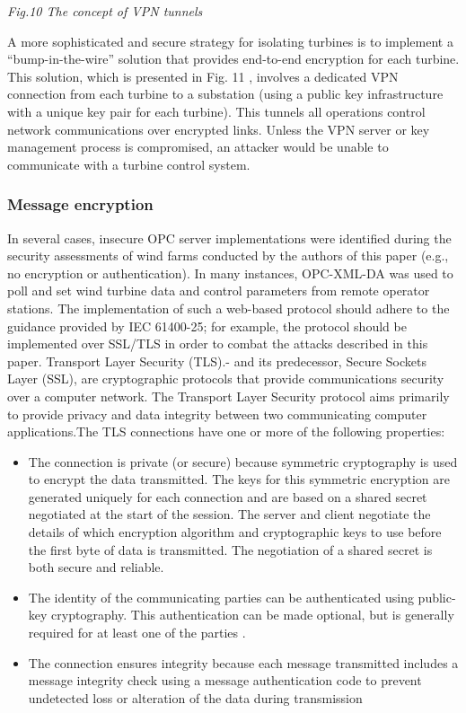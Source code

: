 \documentclass[twosided,a4,10pt]{article}
\begin{document}
\begin{multicols}{2}
\begin{center}
	\textit{Fig.10 The concept of VPN tunnels}
\end{center}
A more sophisticated and secure strategy for isolating turbines is to implement a “bump-in-the-wire” solution that provides end-to-end encryption for each turbine. This solution, which is presented in Fig. 11 , involves a dedicated VPN connection from each turbine to a substation (using a public key infrastructure with a unique key pair 
for each turbine). This tunnels all operations control network communications over encrypted links. Unless the VPN server or key management process is compromised, an attacker would be unable to communicate with a turbine control system. 


\subsubsection{Message encryption}
In several cases, insecure OPC server implementations were identified during the security assessments of wind farms conducted by the authors of this paper (e.g., no encryption or authentication). In many instances, OPC-XML-DA was used to poll and set wind turbine data and control parameters from remote operator stations. The implementation of such a web-based protocol should adhere to the guidance provided by IEC 61400-25; for example, the protocol should be implemented over SSL/TLS in order to combat the attacks described in this paper.
\newline Transport Layer Security (TLS).- and its predecessor, Secure Sockets Layer (SSL), are cryptographic protocols that provide communications security over a computer network. The Transport Layer Security protocol aims primarily to provide privacy and data integrity between two communicating computer applications.The TLS connections have one or more of the following properties:
\begin{itemize}
	\item The connection is private (or secure) because symmetric cryptography is used to encrypt the data transmitted. The keys for this symmetric encryption are generated uniquely for each connection and are based on a shared secret negotiated at the start of the session. The server and client negotiate the details of which encryption algorithm and cryptographic keys to use before the first byte of data is transmitted. The negotiation of a shared secret is both secure and reliable.
	\item The identity of the communicating parties can be authenticated using public-key cryptography. This authentication can be made optional, but is generally required for at least one of the parties .
	\item The connection ensures integrity because each message transmitted includes a message integrity check using a message authentication code to prevent undetected loss or alteration of the data during transmission
\end{itemize}


\end{multicols}
\end{document}
